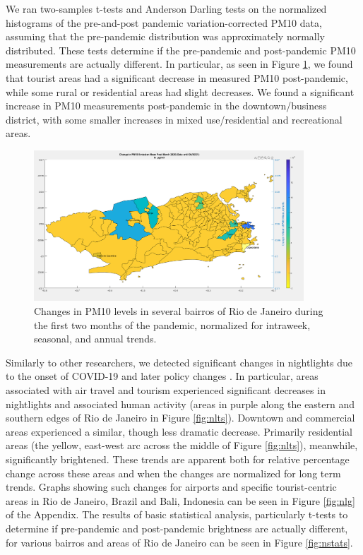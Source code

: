 We ran two-samples t-tests and Anderson Darling tests on the normalized histograms of the pre-and-post pandemic variation-corrected PM10 data, assuming that the pre-pandemic distribution was approximately normally distributed. These tests determine if the pre-pandemic and post-pandemic PM10 measurements are actually different. In particular, as seen in Figure \ref{fig:pm}, we found that tourist areas had a significant decrease in measured PM10 post-pandemic, while some rural or residential areas had slight decreases. We found a significant increase in PM10 measurements post-pandemic in the downtown/business district, with some smaller increases in mixed use/residential and recreational areas. 

\begin{figure}[h]
\centering
\includegraphics[width=0.9\textwidth]{Figures/chap5/pm10.png}
\caption[Changes in PM10 in Rio de Janeiro]{Changes in PM10 levels in several bairros of Rio de Janeiro during the first two months of the pandemic, normalized for intraweek, seasonal, and annual trends.}
\label{fig:pm}
\end{figure}

Similarly to other researchers, we detected significant changes in nightlights due to the onset of COVID-19 and later policy changes \cite{elvidgeDimmingLightsChina2020, xbsdScipy2021Predicting2021}. In particular, areas associated with air travel and tourism experienced significant decreases in nightlights and associated human activity (areas in purple along the eastern and southern edges of Rio de Janeiro in Figure \ref{fig:nlts}). Downtown and commercial areas experienced a similar, though less dramatic decrease. Primarily residential areas (the yellow, east-west arc across the middle of Figure \ref{fig:nlts}), meanwhile, significantly brightened. These trends are apparent both for relative percentage change across these areas and when the changes are normalized for long term trends. Graphs showing such changes for airports and specific tourist-centric areas in Rio de Janeiro, Brazil and Bali, Indonesia can be seen in Figure \ref{fig:nlg} of the Appendix. The results of basic statistical analysis, particularly t-tests to determine if pre-pandemic and post-pandemic brightness are actually different, for various bairros and areas of Rio de Janeiro can be seen in Figure \ref{fig:nstats}.

